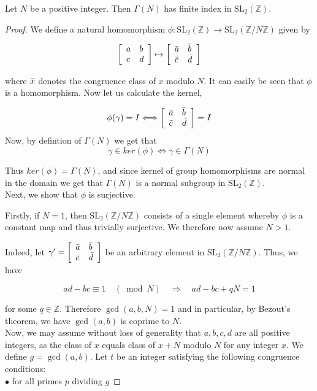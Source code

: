 \begin{proposition}\label{index}
    Let $N$ be a positive integer. Then $\Gamma(N)$ has finite index in $\mathrm{SL}_{2}(\mathbb{Z})$.
\begin{proof}
    We define a natural homomorphism $\phi: \mathrm{SL}_{2}(\mathbb{Z}) \rightarrow \mathrm{SL}_{2}(\mathbb{Z} / N \mathbb{Z})$ given by 

$$
\left[\begin{array}{ll}
a & b \\
c & d
\end{array}\right] \mapsto\left[\begin{array}{ll}
{\Bar{a}} & {\Bar{b}} \\
{\Bar{c}} & {\Bar{d}}
\end{array}\right]
$$ 

where $\Bar{x}$ denotes the congruence class of $x$ modulo $N$. It can easily be seen that $\phi$ is a homomorphism. 
Now let us calculate the kernel,

$$
\phi(\gamma)=I \Longleftrightarrow \left[\begin{array}{ll}
{\Bar{a}} & {\Bar{b}} \\
{\Bar{c}} & {\Bar{d}}
\end{array}\right]=I$$ Now, by defintion of $\Gamma(N)$ we get that $$\gamma \in ker(\phi) \Longleftrightarrow \gamma \in \Gamma(N)
$$

Thus $ker(\phi)=\Gamma(N)$, and since kernel of group homomorphisms are normal in the domain we get that $\Gamma(N)$ is a normal subgroup in $\mathrm{SL}_{2}(\mathbb{Z})$. \\ Next, we show that $\phi$ is surjective.

Firstly, if $N=1$, then $\mathrm{SL}_{2}(\mathbb{Z} / N \mathbb{Z})$ consists of a single element whereby $\phi$ is a constant map and thus trivially surjective. We therefore now assume $N>1$.

Indeed, let $\gamma'=\left[\begin{array}{ll}
{\Bar{a}} & {\Bar{b}} \\
{\Bar{c}} & {\Bar{d}}
\end{array}\right]$ be an arbitrary element in $\mathrm{SL}_{2}(\mathbb{Z} / N \mathbb{Z})$. Thus, we have

$$
a d-b c \equiv 1 \quad(\bmod N) \quad \Longrightarrow \quad a d-b c+q N=1
$$

for some $q \in \mathbb{Z}$. Therefore $\operatorname{gcd}(a, b, N)=1$ and in particular, by Bezout's theorem, we have $\operatorname{gcd}(a, b)$ is coprime to $N$. \\
Now, we may assume without loss of generality that $a, b,c,d$ are all positive integers, as the class of $x$ equals class of $x+N$ modulo $N$ for any integer $x$. We define $g=\operatorname{gcd}(a, b)$.
Let $t$ be an integer satisfying the following congruence conditions:\\
$\bullet$ for all primes $p$ dividing $g$


\end{proof}
\end{proposition}

